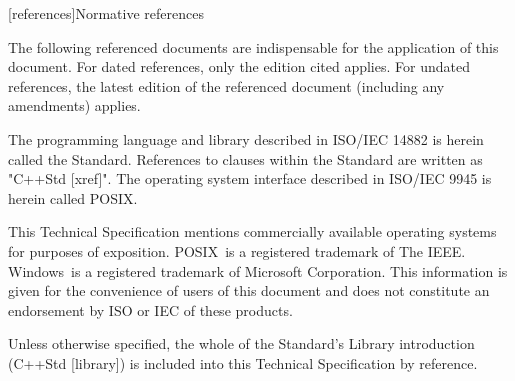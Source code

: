 
[references]{Normative references}

\pnum
The following referenced documents are indispensable for the application of this document. For dated references, only the edition cited applies. For undated references, the latest edition of the referenced document (including any amendments) applies.

\pnum
\enternote The programming language and library described in ISO/IEC 14882 is herein called the \Cpp Standard. References to clauses within the \Cpp Standard are written as "C++Std [xref]".  The operating system interface described in ISO/IEC 9945 is herein called POSIX. \exitnote

\pnum
This Technical Specification mentions commercially available operating systems for purposes of exposition.  POSIX\textregistered\ is a registered trademark of The IEEE. Windows\textregistered\ is a registered trademark of Microsoft Corporation. This information is given for the convenience of users of this document and does not constitute an endorsement by ISO or IEC of these products.

\pnum
Unless otherwise specified, the whole of the \Cpp Standard's Library introduction (C++Std [library]) is included into this Technical Specification by reference.


